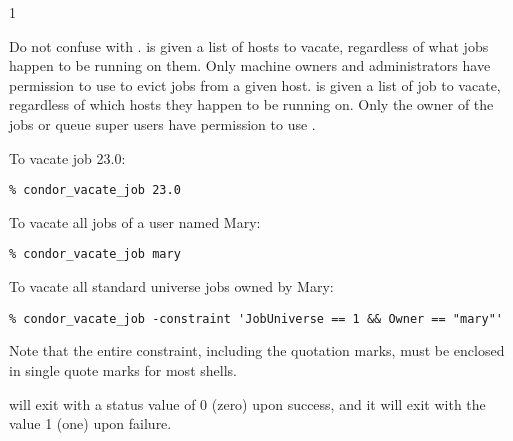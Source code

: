 \begin{ManPage}{\label{man-condor-vacate-job}}{1}
\GenRem

Do not confuse  with .
 is given a list of hosts to vacate, regardless of what
jobs happen to be running on them.
Only machine owners and administrators have permission to use
 to evict jobs from a given host.
 is given a list of job to vacate, regardless of
which hosts they happen to be running on.
Only the owner of the jobs or queue super users have permission to use
.

\Examples

To vacate job 23.0:
\begin{verbatim}
% condor_vacate_job 23.0
\end{verbatim}

To vacate all jobs of a user named Mary:
\begin{verbatim}
% condor_vacate_job mary 
\end{verbatim}

To vacate all standard universe jobs owned by Mary:
\footnotesize
\begin{verbatim}
% condor_vacate_job -constraint 'JobUniverse == 1 && Owner == "mary"'
\end{verbatim}
\normalsize
Note that the entire constraint, including the quotation marks, must
be enclosed in single quote marks for most shells.

\ExitStatus

 will exit with a status value of 0 (zero) upon success,
and it will exit with the value 1 (one) upon failure.

\end{ManPage}
